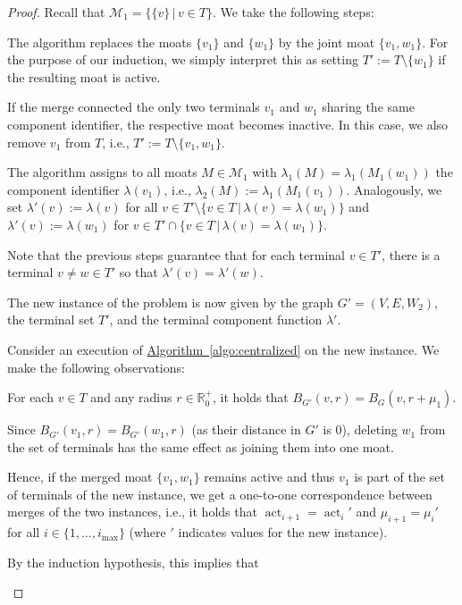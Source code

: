 \documentclass[letterpaper,11pt]{article}
\newcommand{\namedref}[2]{\hyperref[#2]{#1~\ref*{#2}}}
\newcommand{\algref}[1]{\namedref{Algorithm}{#1}}
\newcommand{\R}{\mathbb{R}}
\newcommand{\M}{\mathcal{M}}
\newcommand{\Comp}{\lambda}
\DeclareMathOperator{\act}{act}
\begin{document}
\begin{proof}
Recall that $\M_1=\{\{v\}\,|\,v\in T\}$. We take the following steps:
\begin{compactitem}
  \item The algorithm replaces the moats $\{v_1\}$ and $\{w_1\}$ by the
  joint moat $\{v_1,w_1\}$. For the purpose of our induction, we simply
  interpret this as setting $T':=T\setminus \{w_1\}$ if the resulting moat is
  active.
  \item If the merge connected the only two terminals $v_1$ and $w_1$ sharing
  the same component identifier, the respective moat becomes inactive. In this
  case, we also remove $v_1$ from $T$, i.e., $T':=T\setminus \{v_1,w_1\}$.
  \item The algorithm assigns to all moats $M\in \M_1$ with
  $\Comp_1(M)=\Comp_1(M_1(w_1))$ the component identifier $\Comp(v_1)$, i.e.,
  $\Comp_2(M):=\Comp_1(M_1(v_1))$. Analogously, we set $\Comp'(v):=\Comp(v)$
  for all $v\in T'\setminus \{v\in T\,|\,\Comp(v)=\Comp(w_1)\}$ and
  $\lambda'(v):=\lambda(w_1)$ for $v\in T'\cap \{v\in
  T\,|\,\Comp(v)=\Comp(w_1)\}$.
  \item Note that the previous steps guarantee that for each terminal $v\in T'$,
  there is a terminal $v\neq w\in T'$ so that $\Comp'(v)=\Comp'(w)$.
  \item The new instance of the problem is now given by the graph
  $G'=(V,E,W_2)$, the terminal set $T'$, and the terminal component function
  $\Comp'$.
\end{compactitem}
Consider an execution of \algref{algo:centralized} on the new instance. We make
the following observations:
\begin{compactitem}
  \item For each $v\in T$ and any radius $r\in \R^+_0$, it holds that
  $B_{G'}(v,r)=B_G(v,r+\mu_1)$. 
  \item Since $B_{G'}(v_1,r)=B_{G'}(w_1,r)$ (as their distance in $G'$ is $0$),
  deleting $w_1$ from the set of terminals has the same effect as joining them
  into one moat.
  \item Hence, if the merged moat $\{v_1,w_1\}$ remains active and thus $v_1$ is
  part of the set of terminals of the new instance, we get a one-to-one
  correspondence between merges of the two instances, i.e., it holds that
  $\act_{i+1}=\act_i'$ and $\mu_{i+1}=\mu_i'$ for all $i\in
  \{1,\ldots,i_{\max}\}$ (where $'$ indicates values for the new instance).
  \item By the induction hypothesis, this implies that
  \begin{equation*}

\end{equation*}
\end{compactitem}
\end{proof}
\end{document}
